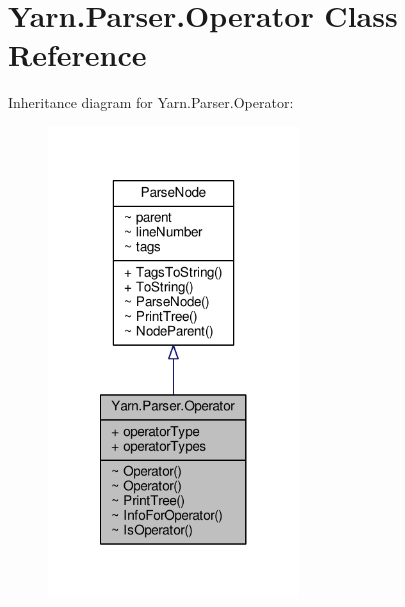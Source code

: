 \hypertarget{a00117}{\section{Yarn.\-Parser.\-Operator Class Reference}
\label{a00117}
}


Inheritance diagram for Yarn.\-Parser.\-Operator\-:
\nopagebreak
\begin{figure}[H]
\begin{center}
\leavevmode
\includegraphics[width=188pt]{d0/d8d/a00612}
\end{center}
\end{figure}



